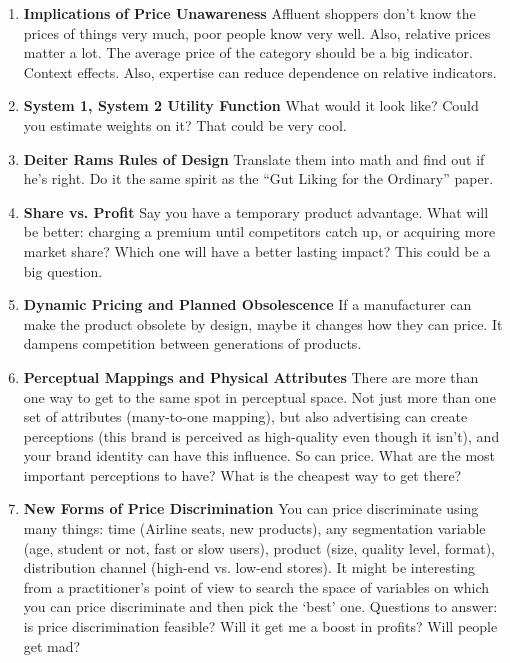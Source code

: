 \documentclass[paper=a4, fontsize=11pt]{scrartcl} %
\numberwithin{equation}{section} %
\numberwithin{figure}{section} %
\numberwithin{table}{section} %
\begin{document}
\begin{enumerate}
\item \textbf{Implications of Price Unawareness} Affluent shoppers don't know the prices of things very much, poor people know very well.  Also, relative prices matter a lot.  The average price of the category should be a big indicator.  Context effects.  Also, expertise can reduce dependence on relative indicators.  

\item \textbf{System 1, System 2 Utility Function} What would it look like?  Could you estimate weights on it?  That could be very cool.

\item \textbf{Deiter Rams Rules of Design} Translate them into math and find out if he's right.  Do it the same spirit as the ``Gut Liking for the Ordinary'' paper.

\item \textbf{Share vs. Profit} Say you have a temporary product advantage.  What will be better: charging a premium until competitors catch up, or acquiring more market share?  Which one will have a better lasting impact?  This could be a big question.

\item \textbf{Dynamic Pricing and Planned Obsolescence}  If a manufacturer can make the product obsolete by design, maybe it changes how they can price.  It dampens competition between generations of products.

\item \textbf{Perceptual Mappings and Physical Attributes}  There are more than one way to get to the same spot in perceptual space.  Not just more than one set of attributes (many-to-one mapping), but also advertising can create perceptions (this brand is perceived as high-quality even though it isn't), and your brand identity can have this influence.  So can price.  What are the most important perceptions to have?  What is the cheapest way to get there?  

\item \textbf{New Forms of Price Discrimination}  You can price discriminate using many things: time (Airline seats, new products), any segmentation variable (age, student or not, fast or slow users), product (size, quality level, format), distribution channel (high-end vs. low-end stores).  It might be interesting from a practitioner's point of view to search the space of variables on which you can price discriminate and then pick the `best' one.  Questions to answer: is price discrimination feasible?  Will it get me a boost in profits?  Will people get mad?   


\end{enumerate}
\end{document}
